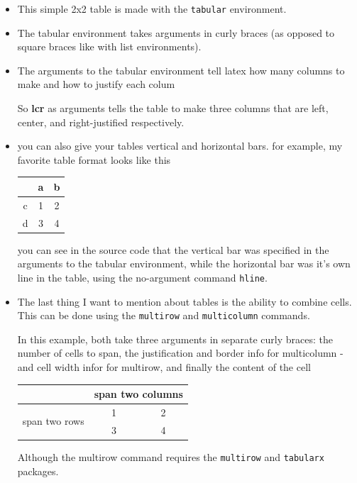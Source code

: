 \documentclass{article}
\begin{document}
\begin{itemize}
\item This simple 2x2 table is made with the \lstinline{tabular} environment.
\item The tabular environment takes arguments in curly braces (as opposed to
      square braces like with list environments).
\item The arguments to the tabular environment tell latex how many columns to
      make and how to justify each colum

      So \textbf{lcr} as arguments tells the table to make three columns that
      are left, center, and right-justified respectively.

\item you can also give your tables vertical and horizontal bars. for example,
      my favorite table format looks like this

      \begin{tabular}{c|cc}
        & a & b \\
      \hline
      c & 1 & 2 \\
      d & 3 & 4 \\
      \end{tabular}

      you can see in the source code that the vertical bar was specified in the
      arguments to the tabular environment, while the horizontal bar was it's
      own line in the table, using the no-argument command \lstinline{hline}.

\item The last thing I want to mention about tables is the ability to combine
      cells. This can be done using the \lstinline{multirow} and
      \lstinline{multicolumn} commands.

      In this example, both take three arguments in separate curly braces:
      the number of cells
      to span, the justification and border info for multicolumn - and cell
      width infor for multirow, and finally the content of the cell

      \begin{tabular}{c|cc}
        & \multicolumn{2}{c}{span two columns}\\
        \hline
        \multirow{2}{*}{span two rows}
        & 1 & 2\\
        & 3 & 4
      \end{tabular}

      Although the multirow command requires the \lstinline{multirow} and
      \lstinline{tabularx} packages.
\end{itemize}
\end{document}
